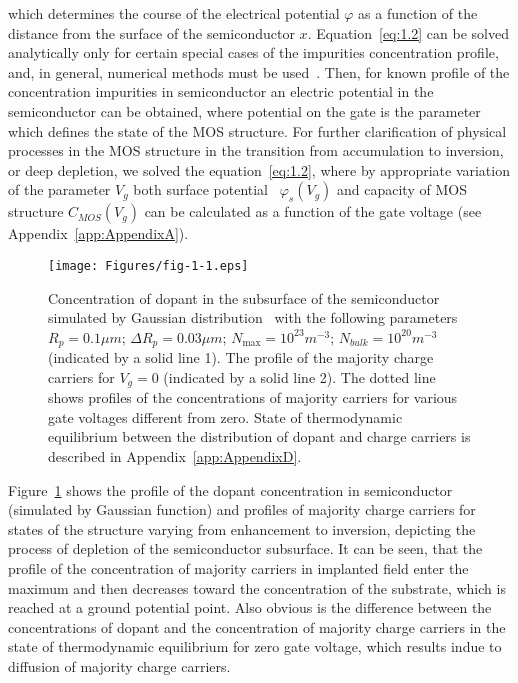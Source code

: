 which determines the course of the electrical potential $\varphi$ as a
function of the distance from the surface of the semiconductor
$x$. Equation~\ref{eq:1.2} can be solved analytically only for certain
special cases of the impurities concentration profile, and, in
general, numerical methods must be used~\cite{1.9,1.10}. Then, for
known profile of the concentration impurities in semiconductor an
electric potential in the semiconductor can be obtained, where
potential on the gate is the parameter which defines the state of the
MOS structure. For further clarification of physical processes in the
MOS structure in the transition from accumulation to inversion, or
deep depletion, we solved the equation~\ref{eq:1.2}, where by
appropriate variation of the parameter $V_g$ both surface
potential~ $\varphi_{s}(V_g)$ and capacity of
MOS structure $C_{MOS}(V_g)$ can be calculated as a function of the
gate voltage (see Appendix~\ref{app:AppendixA}).

\begin{figure}[h!]\centering
  \texttt{[image: Figures/fig-1-1.eps]}%
  \caption[Concentration of dopant in the subsurface of the
    semiconductor] {Concentration of dopant in the subsurface of the
    semiconductor simulated by Gaussian distribution~\cite{1.11} with
    the following parameters $R_p=0.1 \mu{m}$;
    $\Delta{R_p}=0.03\mu{m}$; $N_{\max}=10^{23} m^{-3}$;
    $N_{bulk}=10^{20} m^{-3}$ (indicated by a solid line 1). The
    profile of the majority charge carriers for $V_g=0$ (indicated by
    a solid line 2). The dotted line shows profiles of the
    concentrations of majority carriers for various gate voltages
    different from zero. State of thermodynamic equilibrium between
    the distribution of dopant and charge carriers is described in
    Appendix~\ref{app:AppendixD}.}\label{fig:1.1}
\end{figure}

\par Figure~\ref{fig:1.1} shows the profile of the dopant
concentration in semiconductor (simulated by Gaussian function) and
profiles of majority charge carriers for states of the structure
varying from enhancement to inversion, depicting the process of
depletion of the semiconductor subsurface. It can be seen, that the
profile of the concentration of majority carriers in implanted field
enter the maximum and then decreases toward the concentration of the
substrate, which is reached at a ground potential point. Also obvious
is the difference between the concentrations of dopant and the
concentration of majority charge carriers in the state of
thermodynamic equilibrium for zero gate voltage, which results indue
to diffusion of majority charge carriers.


